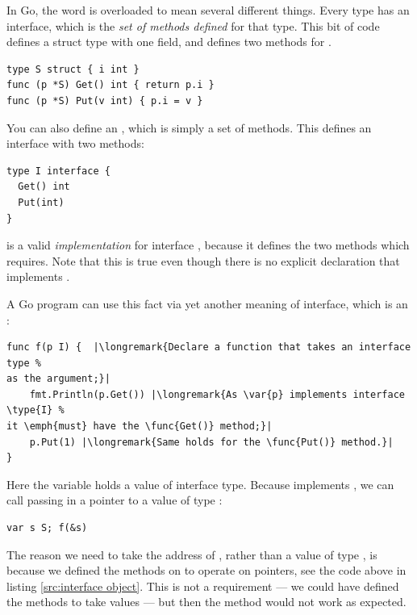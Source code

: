 \noindent{}
In Go, the word  is overloaded to mean several different
things. Every type has an interface, which is the \emph{set of methods
defined} for 
that type. This bit of code defines a struct type  with one field, and
defines two methods for .
\begin{lstlisting}[caption=Defining a struct and methods on it,label=src:interface object]
type S struct { i int }
func (p *S) Get() int { return p.i }
func (p *S) Put(v int) { p.i = v }
\end{lstlisting}
You can also define an , which is simply a set of methods.
This defines an interface  with two methods:
\begin{lstlisting}
type I interface {
  Get() int
  Put(int)
}
\end{lstlisting}

\noindent{} is a valid \emph{implementation} for interface , because it defines the two 
methods which  requires. Note that this is true even though there is 
no explicit declaration that  implements . 

A Go program can use 
this fact via yet another meaning of interface, which is an
:

\begin{lstlisting}
func f(p I) {  |\longremark{Declare a function that takes an interface type %
as the argument;}|
    fmt.Println(p.Get()) |\longremark{As \var{p} implements interface \type{I} %
it \emph{must} have the \func{Get()} method;}|
    p.Put(1) |\longremark{Same holds for the \func{Put()} method.}|
}
\end{lstlisting}
\showremarks
Here the variable  holds a value of interface type. Because
 implements , we can call  passing in a pointer to a 
value of type :
\begin{lstlisting}
var s S; f(&s)
\end{lstlisting}

The reason we need to take the address of , rather than a value of type
, is because we defined the methods on  to operate on
pointers, see the code above in listing \ref{src:interface object}.
This is not a requirement --- we could have defined the methods to take
values --- but then the  method would not work as expected.

